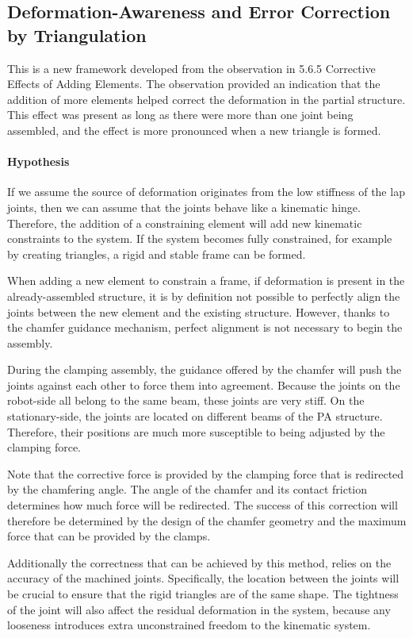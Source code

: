 \subsection{Deformation-Awareness and Error Correction by Triangulation}
This is a new framework developed from the observation in 5.6.5 Corrective Effects of Adding Elements. The observation provided an indication that the addition of more elements helped correct the deformation in the partial structure. This effect was present as long as there were more than one joint being assembled, and the effect is more pronounced when a new triangle is formed. 

\paragraph{Hypothesis}

If we assume the source of deformation originates from the low stiffness of the lap joints, then we can assume that the joints behave like a kinematic hinge. Therefore, the addition of a constraining element will add new kinematic constraints to the system. If the system becomes fully constrained, for example by creating triangles, a rigid and stable frame can be formed.

When adding a new element to constrain a frame, if deformation is present in the already-assembled structure, it is by definition not possible to perfectly align the joints between the new element and the existing structure. However, thanks to the chamfer guidance mechanism, perfect alignment is not necessary to begin the assembly.

During the clamping assembly, the guidance offered by the chamfer will push the joints against each other to force them into agreement. Because the joints on the robot-side all belong to the same beam, these joints are very stiff. On the stationary-side, the joints are located on different beams of the PA structure. Therefore, their positions are much more susceptible to being adjusted by the clamping force. 

Note that the corrective force is provided by the clamping force that is redirected by the chamfering angle. The angle of the chamfer and its contact friction determines how much force will be redirected. The success of this correction will therefore be determined by the design of the chamfer geometry and the maximum force that can be provided by the clamps. 

Additionally the correctness that can be achieved by this method, relies on the accuracy of the machined joints. Specifically, the location between the joints will be crucial to ensure that the rigid triangles are of the same shape. The tightness of the joint will also affect the residual deformation in the system, because any looseness introduces extra unconstrained freedom to the kinematic system. 

